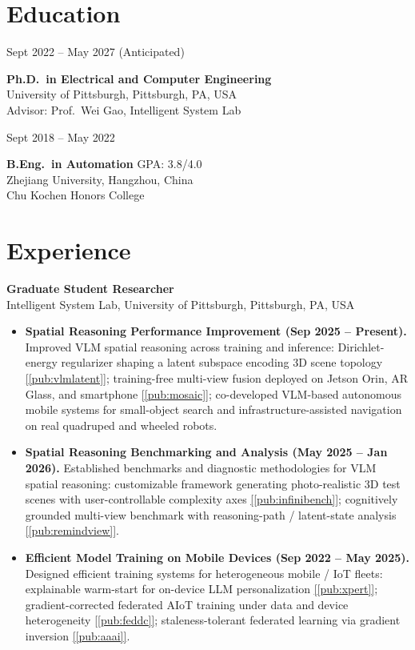\documentclass[11pt, letterpaper]{article}
\newenvironment{datedentry}[1]{%
  \par\noindent
  \begin{minipage}[t]{2.8cm}\raggedright\small #1\end{minipage}%
  \hspace{0.3cm}%
  \begin{minipage}[t]{\dimexpr\linewidth-3.1cm\relax}\raggedright
}{\end{minipage}\par\medskip}
\newcommand{\citeref}[1]{\hyperref[#1]{[\ref*{#1}]}}
\begin{document}
\section{Education}

\begin{datedentry}{Sept 2022 -- May 2027 (Anticipated)}
\textbf{Ph.D.\ in Electrical and Computer Engineering}\\
University of Pittsburgh, Pittsburgh, PA, USA\\
Advisor: Prof.\ Wei Gao, Intelligent System Lab
\end{datedentry}

\begin{datedentry}{Sept 2018 -- May 2022}
\textbf{B.Eng.\ in Automation} \hfill GPA: 3.8/4.0\\
Zhejiang University, Hangzhou, China\\
Chu Kochen Honors College
\end{datedentry}

\section{Experience}


\textbf{Graduate Student Researcher}\\
Intelligent System Lab, University of Pittsburgh, Pittsburgh, PA, USA
\begin{itemize}[leftmargin=1.1em, itemsep=2pt, topsep=3pt]
  \item \textbf{Spatial Reasoning Performance Improvement (Sep 2025 -- Present).} Improved VLM spatial reasoning across training and inference: Dirichlet-energy regularizer shaping a latent subspace encoding 3D scene topology \citeref{pub:vlmlatent}; training-free multi-view fusion deployed on Jetson Orin, AR Glass, and smartphone \citeref{pub:mosaic}; co-developed VLM-based autonomous mobile systems for small-object search and infrastructure-assisted navigation on real quadruped and wheeled robots.

  \item \textbf{Spatial Reasoning Benchmarking and Analysis (May 2025 -- Jan 2026).} Established benchmarks and diagnostic methodologies for VLM spatial reasoning: customizable framework generating photo-realistic 3D test scenes with user-controllable complexity axes \citeref{pub:infinibench}; cognitively grounded multi-view benchmark with reasoning-path / latent-state analysis \citeref{pub:remindview}.

  \item \textbf{Efficient Model Training on Mobile Devices (Sep 2022 -- May 2025).} Designed efficient training systems for heterogeneous mobile / IoT fleets: explainable warm-start for on-device LLM personalization \citeref{pub:xpert}; gradient-corrected federated AIoT training under data and device heterogeneity \citeref{pub:feddc}; staleness-tolerant federated learning via gradient inversion \citeref{pub:aaai}.

\end{itemize}
\end{document}

